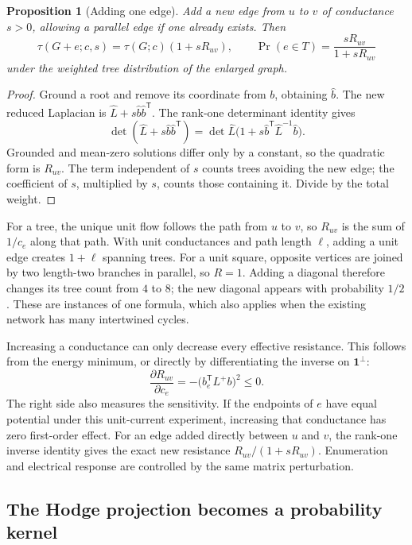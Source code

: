 \documentclass[11pt]{article}
\newtheorem{proposition}[theorem]{Proposition}
\theoremstyle{definition}
\theoremstyle{remark}
\begin{document}
\begin{proposition}[Adding one edge]\label{prop:glin-add-edge}
Add a new edge from $u$ to $v$ of conductance $s>0$, allowing a parallel edge if one already exists. Then
\begin{equation}\label{eq:glin-edge-add}
 \tau(G+e;c,s)=\tau(G;c)(1+sR_{uv}),
 \qquad
 \Pr(e\in T)=\frac{sR_{uv}}{1+sR_{uv}}
\end{equation}
under the weighted tree distribution of the enlarged graph.
\end{proposition}
\begin{proof}
Ground a root and remove its coordinate from $b$, obtaining $\widehat b$. The new reduced Laplacian is $\widehat L+s\widehat b\widehat b^{\mathsf T}$. The rank-one determinant identity gives
\[
 \det(\widehat L+s\widehat b\widehat b^{\mathsf T})
 =\det\widehat L\bigl(1+s\widehat b^{\mathsf T}\widehat L^{-1}\widehat b\bigr).
\]
Grounded and mean-zero solutions differ only by a constant, so the quadratic form is $R_{uv}$. The term independent of $s$ counts trees avoiding the new edge; the coefficient of $s$, multiplied by $s$, counts those containing it. Divide by the total weight.
\end{proof}

For a tree, the unique unit flow follows the path from $u$ to $v$, so $R_{uv}$ is the sum of $1/c_e$ along that path. With unit conductances and path length $\ell$, adding a unit edge creates $1+\ell$ spanning trees. For a unit square, opposite vertices are joined by two length-two branches in parallel, so $R=1$. Adding a diagonal therefore changes its tree count from $4$ to $8$; the new diagonal appears with probability $1/2$. These are instances of one formula, which also applies when the existing network has many intertwined cycles.

Increasing a conductance can only decrease every effective resistance. This follows from the energy minimum, or directly by differentiating the inverse on $\mathbf1^\perp$:
\[
 \frac{\partial R_{uv}}{\partial c_e}
 =-\bigl(b_e^{\mathsf T}L^+b\bigr)^2\le0.
\]
The right side also measures the sensitivity. If the endpoints of $e$ have equal potential under this unit-current experiment, increasing that conductance has zero first-order effect. For an edge added directly between $u$ and $v$, the rank-one inverse identity gives the exact new resistance $R_{uv}/(1+sR_{uv})$. Enumeration and electrical response are controlled by the same matrix perturbation.

\subsection{The Hodge projection becomes a probability kernel}
\end{document}
